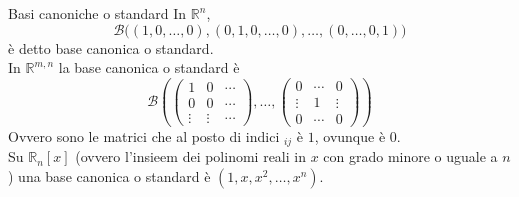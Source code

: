 \begin{SubDef}{Basi canoniche o standard}
  In $\mathbb{R}^n$,
  \begin{equation*}
    \mathscr{B}\bigl((1,0,\ldots,0),(0,1,0,\ldots,0),\ldots,(0,\ldots,0,1)\bigr)
  \end{equation*}
  è detto base canonica o standard.\\[\baselineskip]
  In $\mathbb{R}^{m,n}$ la base canonica o standard è
  \begin{equation*}
    \mathscr{B} \left(
      \begin{pmatrix}
        1 & 0 &\cdots\\
        0 & 0 & \cdots\\
        \vdots & \vdots & \cdots
      \end{pmatrix},\ldots,
      \begin{pmatrix}
        0 & \cdots & 0\\
        \vdots & 1 & \vdots\\
        0 & \cdots & 0
      \end{pmatrix}
    \right)
  \end{equation*}
  Ovvero sono le matrici che al posto di indici $_{ij}$ è $1$, ovunque è
  $0$.\\[\baselineskip]
  Su $\mathbb{R}_n[x]$ (ovvero l'insieem dei polinomi reali in $x$ con grado minore o
  uguale a $n$) una base canonica o standard è $(1,x,x^2,\ldots,x^n)$.
\end{SubDef}
